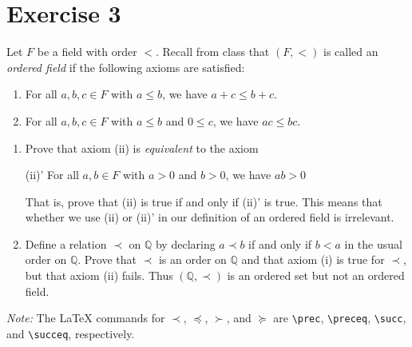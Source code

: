 \documentclass[11pt]{article}
\begin{document}
\section{Exercise 3}
    Let $F$ be a field with order $<$. Recall from class that $(F, <)$ is called an \textit{ordered field} if the following axioms are satisfied:
    \begin{enumerate}[label=(\roman*)]
        \item   For all $a, b, c \in F$ with $a \leq b$, we have $a + c \leq b + c$.
        \item   For all $a, b, c \in F$ with $a \leq b$ and $0 \leq c$, we have $ac \leq bc$.
    \end{enumerate}
    \begin{enumerate}[label=(\alph*)]
        \item 
        Prove that axiom (ii) is \textit{equivalent} to the axiom

        (ii)' For all $a, b \in F$ with $a > 0$ and $b > 0$, we have $ab > 0$

        That is, prove that (ii) is true if and only if (ii)' is true. This means that whether we use (ii) or (ii)' in our definition of an ordered field is irrelevant.

        \item 
        Define a relation $\prec$ on $\mathbb{Q}$ by declaring $a \prec b$ if and only if $b < a$ in the usual order on $\mathbb{Q}$. Prove that $\prec$ is an order on $\mathbb{Q}$ and that axiom (i) is true for $\prec$, but that axiom (ii) fails. Thus $(\mathbb{Q}, \prec)$ is an ordered set but not an ordered field.
    \end{enumerate}

    \textit{Note:} The LaTeX commands for $\prec$, $\preceq$, $\succ$, and $\succeq$ are \verb|\prec|, \verb|\preceq|, \verb|\succ|, and \verb|\succeq|, respectively.
\end{document}
